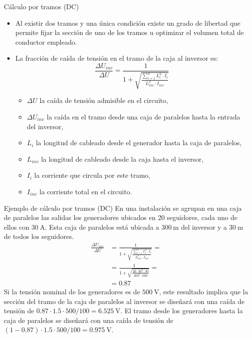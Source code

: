 \documentclass[aspectratio=169, usenames,svgnames,dvipsnames]{beamer}
\begin{document}
\begin{frame}[label={sec:org385cebc}]{Cálculo por tramos (DC)}
\begin{itemize}
\item Al existir dos tramos y una única condición existe un grado de libertad que permite fijar la sección de uno de los tramos u optimizar el volumen total de conductor empleado.

\item La fracción de caída de tensión en el tramo de la caja al inversor es:  
\begin{equation*}
  \frac{\Delta U_{inv}}{\Delta U}= \frac{1}{1+\sqrt{\frac{\sum_{i=1}^nL_{i}^2
        \cdot I_{i}}{L_{inv}^2 \cdot I_{inv}}}}
\end{equation*}

\begin{itemize}
\item \(\Delta U\) la caída de tensión admisible en el circuito,

\item \(\Delta U_{inv}\) la caída en el tramo desde una caja de paralelos hasta la entrada del inversor,

\item \(L_i\) la longitud de cableado desde el generador hasta la caja de paralelos,
\item \(L_{inv}\) la longitud de cableado desde la caja hasta el inversor,

\item \(I_i\) la corriente que circula por este tramo,

\item \(I_{inv}\) la corriente total en el circuito.
\end{itemize}
\end{itemize}
\end{frame}

\begin{frame}[label={sec:orgf754b45}]{Ejemplo de cálculo por tramos (DC)}
En una instalación se agrupan en una caja de paralelos las salidas los generadores ubicados en 20 seguidores, cada uno de ellos con \(\qty{30}{\ampere}\). Esta caja de paralelos está ubicada a \(\qty{300}{\meter}\) del inversor y a \(\qty{30}{\meter}\) de todos los seguidores.
\begin{align*}
  \frac{\Delta U_{inv}}{\Delta U} &= \frac{1}{1+\sqrt{\frac{\sum_{i=1}^nL_{i}^2
                                    \cdot I_{i}}{L_{inv}^2 \cdot I_{inv}}}} = \\
                                  &=\frac{1}{1 + \sqrt{\frac{20 \cdot 30^2 \cdot 30}{200^2 \cdot 600 }}} = \\
                                  &= \num{0.87}
\end{align*}
Si la tensión nominal de los generadores es de \(\qty{500}{\volt}\), este resultado implica que la sección del tramo de la caja de paralelos al inversor se diseñará con una caída de tensión de \(\num{0.87} \cdot \num{1.5} \cdot 500 /100 = \qty{6.525}{\volt}\). El tramo desde los generadores hasta la caja de paralelos se diseñará con una caída de tensión de \((1 - \num{0.87}) \cdot \num{1.5} \cdot 500 /100 = \qty{0.975}{\volt}\).
\end{frame}
\end{document}
